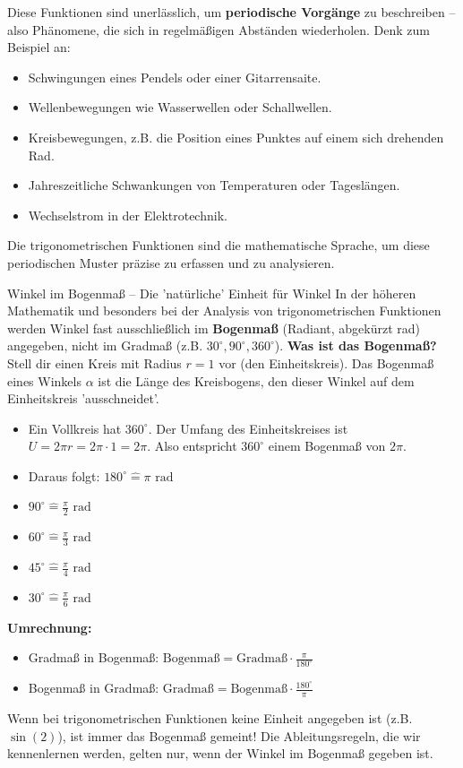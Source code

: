 Diese Funktionen sind unerlässlich, um \textbf{periodische Vorgänge} zu beschreiben – also Phänomene, die sich in regelmäßigen Abständen wiederholen. Denk zum Beispiel an:
\begin{itemize}
    \item Schwingungen eines Pendels oder einer Gitarrensaite.
    \item Wellenbewegungen wie Wasserwellen oder Schallwellen.
    \item Kreisbewegungen, z.B. die Position eines Punktes auf einem sich drehenden Rad.
    \item Jahreszeitliche Schwankungen von Temperaturen oder Tageslängen.
    \item Wechselstrom in der Elektrotechnik.
\end{itemize}
Die trigonometrischen Funktionen sind die mathematische Sprache, um diese periodischen Muster präzise zu erfassen und zu analysieren.

\begin{infoboxumgebung}{Winkel im Bogenmaß – Die 'natürliche' Einheit für Winkel}
In der höheren Mathematik und besonders bei der Analysis von trigonometrischen Funktionen werden Winkel fast ausschließlich im \textbf{Bogenmaß} (Radiant, abgekürzt rad) angegeben, nicht im Gradmaß (z.B. $30^\circ, 90^\circ, 360^\circ$).
\textbf{Was ist das Bogenmaß?}
Stell dir einen Kreis mit Radius $r=1$ vor (den Einheitskreis). Das Bogenmaß eines Winkels $\alpha$ ist die Länge des Kreisbogens, den dieser Winkel auf dem Einheitskreis 'ausschneidet'.
\begin{itemize}
    \item Ein Vollkreis hat $360^\circ$. Der Umfang des Einheitskreises ist $U = 2\pi r = 2\pi \cdot 1 = 2\pi$.
    Also entspricht $360^\circ$ einem Bogenmaß von $2\pi$.
    \item Daraus folgt: $180^\circ \widehat{=} \pi \text{ rad}$
    \item $90^\circ \widehat{=} \frac{\pi}{2} \text{ rad}$
    \item $60^\circ \widehat{=} \frac{\pi}{3} \text{ rad}$
    \item $45^\circ \widehat{=} \frac{\pi}{4} \text{ rad}$
    \item $30^\circ \widehat{=} \frac{\pi}{6} \text{ rad}$
\end{itemize}
\textbf{Umrechnung:}
\begin{itemize}
    \item Gradmaß in Bogenmaß: $\text{Bogenmaß} = \text{Gradmaß} \cdot \frac{\pi}{180^\circ}$
    \item Bogenmaß in Gradmaß: $\text{Gradmaß} = \text{Bogenmaß} \cdot \frac{180^\circ}{\pi}$
\end{itemize}
Wenn bei trigonometrischen Funktionen keine Einheit angegeben ist (z.B. $\sin(2)$), ist immer das Bogenmaß gemeint! Die Ableitungsregeln, die wir kennenlernen werden, gelten nur, wenn der Winkel im Bogenmaß gegeben ist.
\end{infoboxumgebung}

